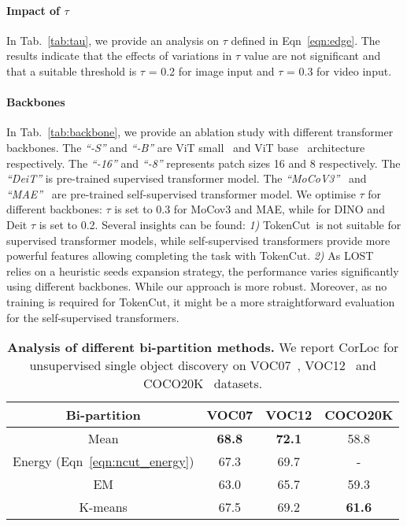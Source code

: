\documentclass[twocolumn]{article}
\newcommand{\name} {TokenCut}
\begin{document}
\paragraph*{Impact of $\tau$} In Tab.~\ref{tab:tau}, we provide an analysis on $\tau$ defined in Eqn~\ref{eqn:edge}. The results indicate that the effects of variations in $\tau$ value are not significant and that a suitable threshold is $\tau$ = 0.2 for image input and $\tau$ = 0.3 for video input. 

 





\paragraph*{Backbones}

In Tab.~\ref{tab:backbone}, we provide an ablation study with different transformer backbones. The \textit{``-S''} and \textit{``-B''} are ViT small~\cite{dosovitskiy2020image, caron2021emerging} and ViT base~\cite{dosovitskiy2020image, caron2021emerging} architecture respectively. The \textit{``-16''} and \textit{``-8''} represents patch sizes 16 and 8 respectively. The \textit{``DeiT''} is pre-trained supervised transformer model. The \textit{``MoCoV3''}~\cite{chen2021empirical} and \textit{``MAE''}~\cite{he2022masked} are pre-trained self-supervised transformer model. We optimise $\tau$ for different backbones: $\tau$ is set to 0.3 for MoCov3 and MAE, while for DINO and Deit $\tau$ is set to 0.2. Several insights can be found: \textit{1)} \name~is not suitable for supervised transformer models, while self-supervised transformers provide more powerful features allowing completing the task with \name. \textit{2)} As LOST~\cite{simeoni2021localizing} relies on a heuristic seeds expansion strategy, the performance varies significantly using different backbones. While our approach is more robust. Moreover, as no training is required for \name, it might be a more straightforward evaluation for the self-supervised transformers. 



\begin{table}[!t]
	\begin{center}
	\caption{\textbf{Analysis of different bi-partition methods.} We report CorLoc for unsupervised single object discovery on VOC07~\cite{pascal-voc-2007}, VOC12~\cite{pascal-voc-2012} and COCO20K~\cite{lin2014microsoft,vo2020toward} datasets.}   
	
    \begin{tabular}{cccc}
    \toprule Bi-partition &
    VOC07 & VOC12 & COCO20K \\
    \midrule
    Mean        & \bf 68.8 & \bf 72.1 & 58.8 \\
    Energy (Eqn~\ref{eqn:ncut_energy}) & 67.3 & 69.7 & -\\
    EM          & 63.0 & 65.7 & 59.3 \\
    K-means      & 67.5 &  69.2 &  \bf 61.6  \\
    \bottomrule
    \end{tabular}
	\label{tab:partition}
	\end{center}
\end{table} 
\end{document}
